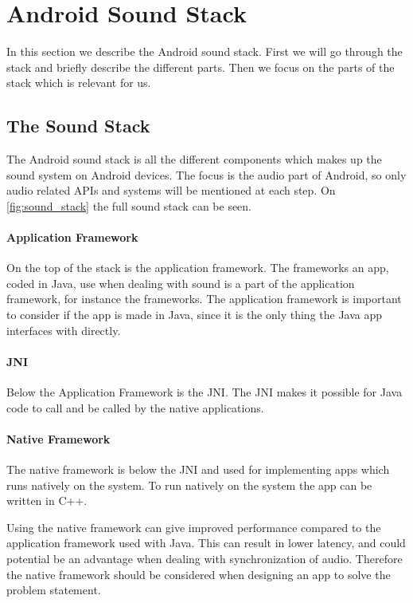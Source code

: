 \section{Android Sound Stack}
In this section we describe the Android sound stack.
First we will go through the stack and briefly describe the different parts.
Then we focus on the parts of the stack which is relevant for us.

\subsection{The Sound Stack}
The Android sound stack is all the different components which makes up the sound system on Android devices.
The focus is the audio part of Android, so only audio related \acp{API} and systems will be mentioned at each step. 
On \cref{fig:sound_stack} the full sound stack can be seen.

\paragraph{Application Framework}
On the top of the stack is the application framework.
The frameworks an app, coded in Java, use when dealing with sound is a part of the application framework,
for instance the  frameworks.
The application framework is important to consider if the app is made in Java,
since it is the only thing the Java app interfaces with directly.%

\paragraph{JNI}
Below the Application Framework is the \ac{JNI}.
The \ac{JNI} makes it possible for Java code to call and be called by the native applications\cite{jni}.

\paragraph{Native Framework}
The native framework is below the \ac{JNI} and used for implementing apps which runs natively on the system.
To run natively on the system the app can be written in C++.

Using the native framework can give improved performance compared to the application framework used with Java\cite{nat_perf_2}.
This can result in lower latency, and could potential be an advantage when dealing with synchronization of audio.
Therefore the native framework should be considered when designing an app to solve the problem statement.

